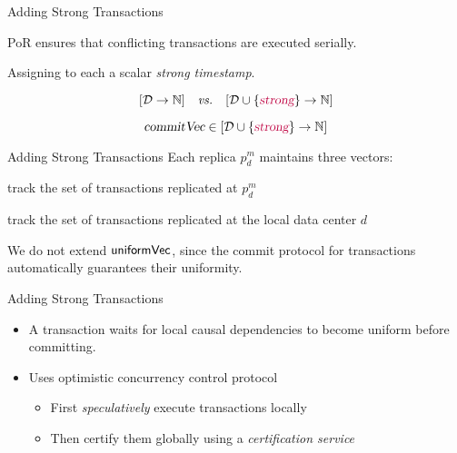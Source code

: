 
\begin{frame}{Adding Strong Transactions}
  \begin{center}
    PoR ensures that conflicting transactions are executed serially.

    \pause
    \vspace{0.50cm}
    Assigning to each  a scalar \emph{strong timestamp}.
  \end{center}

  \pause
  \vspace{0.30cm}
  \[
    [\mathcal{D} \to \mathbb{N}] \quad\text{\emph{vs.}}\quad [\mathcal{D} \cup \{\textcolor{purple}{\textsl{strong}}\} \to \mathbb{N}]
  \]

  \pause
  \[
    \textsl{commitVec} \in [\mathcal{D} \cup \{\textcolor{purple}{\textsl{strong}}\} \to \mathbb{N}]
  \]
\end{frame}

\begin{frame}{Adding Strong Transactions}
  Each replica $p^{m}_{d}$ maintains three vectors: \\[5pt]

  \begin{description}[<+->]
    \setlength{\itemsep}{10pt}
    \item[$\knownVC\text{[\strongcolor{\strongentry}]}$:] track the set of  transactions replicated at $p^{m}_{d}$
    \item[$\stableVC\text{[\strongcolor{\strongentry}]}$:] track the set of  transactions replicated at the local data center $d$
  \end{description}

  \pause
  \vspace{0.50cm}
  We do not extend ${\sf uniformVec}$, since the commit protocol for
   transactions automatically guarantees their uniformity.
\end{frame}

\begin{frame}{Adding Strong Transactions}
  \begin{itemize}[<+->]
    \setlength{\itemsep}{8pt}
    \item A  transaction waits for local causal dependencies to
          become uniform before committing.
    \item Uses optimistic concurrency control protocol \\[6pt]
          \begin{itemize}
            \setlength{\itemsep}{6pt}
            \item First \emph{speculatively} execute  transactions locally
            \item Then certify them globally using a \emph{certification service}
          \end{itemize}
  \end{itemize}
\end{frame}

